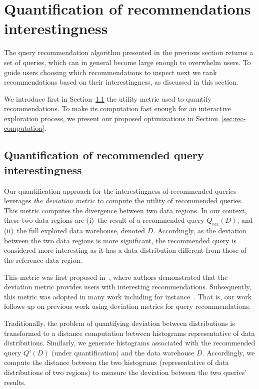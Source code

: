 \section{Quantification of recommendations interestingness}
\label{quantification-rec}

The query recommendation algorithm presented in the previous section returns a set of queries, which can in general become large enough to overwhelm users. To guide users choosing which recommendations to inspect next we rank recommendations based on their interestingness, as discussed in this section. 

 
We introduce first in Section~\ref{sec:rec-metric} the utility metric used to quantify recommendations. 
To make its computation fast enough for an interactive exploration process, we present our proposed optimizations in Section~\ref{sec:rec-computation}.
 

 \subsection{Quantification of recommended query interestingness}
\label{sec:rec-metric}
 


 Our quantification approach for the interestingness of recommended queries leverages \emph{the deviation metric} to compute the utility of recommended queries. This metric computes the divergence between two data regions.
In our context, these two data regions are (i)~the result of a recommended query $Q_{rec}(D)$, and (ii)~the full explored data warehouse, denoted $D$.
      Accordingly, as the deviation between the two data regions is more significant, the recommended query is considered more interesting as it has a data distribution different from those of the reference data region.
  



This metric was first proposed in~\cite{Vartak}, where authors demonstrated that the deviation metric provides users with interesting recommendations.
Subsequently, this metric was adopted in many work including for instance~\cite{Sellam:2016,Ehsan:18,Lee:2019}.
That is, our work follows up on previous work using deviation metrics for query recommendations. 



 Traditionally, the problem of quantifying deviation between distributions is transformed to a distance computation between histograms representative of data distributions.
Similarly, we generate histograms associated with the recommended query $Q'(D)$ (under quantification) and the data warehouse $D$. Accordingly, we compute the distance between the two histograms (representative of data distributions of two regions) to measure the deviation between the two queries' results.




